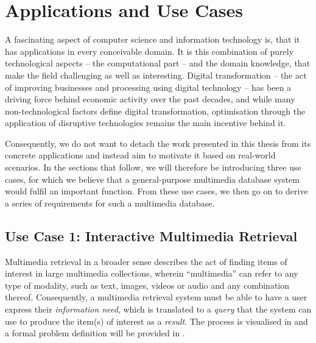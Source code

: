 \chapter{Applications and Use Cases}
\label{chapter:applications}

A fascinating aspect of computer science and information technology is, that it has applications in every conceivable domain. It is this combination of purely technological aspects -- the computational part -- and the domain knowledge, that make the field challenging as well as interesting. Digital transformation -- the act of improving businesses and processing using digital technology \cite{Vial:2019Understanding} -- has been a driving force behind economic activity over the past decades, and while many non-technological factors define digital transformation, optimisation through the application of disruptive technologies remains the main incentive behind it.

Consequently, we do not want to detach the work presented in this thesis from its concrete applications and instead aim to motivate it based on real-world scenarios. In the sections that follow, we will therefore be introducing three use cases, for which we believe that a general-purpose multimedia database system would fulfil an important function. From these use cases, we then go on to derive a series of requirements for such a multimedia database.

\section{Use Case 1: Interactive Multimedia Retrieval}
\label{section:application_retrieval}

Multimedia retrieval in a broader sense describes the act of finding items of interest in large multimedia collections, wherein ``multimedia'' can refer to any type of modality, such as text, images, videos or audio and any combination thereof. Consequently, a multimedia retrieval system must be able to have a user express their \emph{information need}, which is translated to a \emph{query} that the system can use to produce the item(s) of interest as a \emph{result}. The process is visualised in  and a formal problem definition will be provided in .

